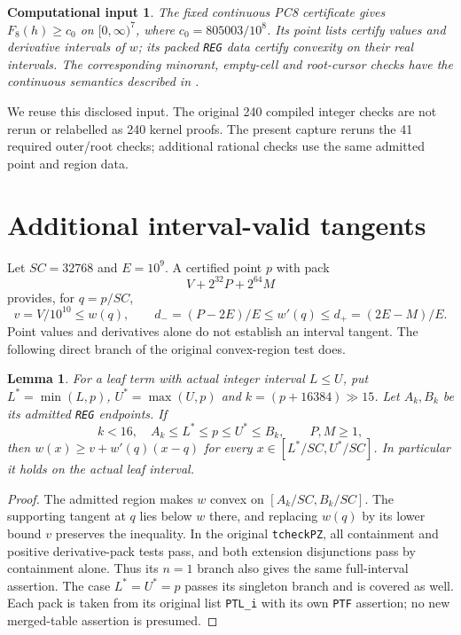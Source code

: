 \documentclass[11pt,a4paper]{article}
\newtheorem{lemma}[theorem]{Lemma}
\newtheorem{inputclaim}[theorem]{Computational input}
\begin{document}
\begin{inputclaim}\label{in:old}
The fixed continuous PC8 certificate gives $F_8(h)\ge c_0$
on $[0,\infty)^7$, where $c_0=805003/10^8$.
Its point lists certify values and derivative intervals of $w$;
its packed \texttt{REG} data certify convexity on their real intervals.
The corresponding minorant, empty-cell and root-cursor checks have
the continuous semantics described in \cite{Joint,Repo}.
\end{inputclaim}

We reuse this disclosed input. The original 240 compiled integer checks
are not rerun or relabelled as 240 kernel proofs. The present capture
reruns the 41 required outer/root checks; additional rational checks
use the same admitted point and region data.

\section{Additional interval-valid tangents}\label{sec:cuts}

Let $SC=32768$ and $E=10^9$. A certified point $p$ with pack
\[
 V+2^{32}P+2^{64}M
\]
provides, for $q=p/SC$,
\[
 v=V/10^{10}\le w(q),\qquad
 d_-=(P-2E)/E\le w'(q)\le d_+=(2E-M)/E.
\]
Point values and derivatives alone do not establish an interval tangent.
The following direct branch of the original convex-region test does.

\begin{lemma}\label{lem:extra}
For a leaf term with actual integer interval $L\le U$, put
$L^*=\min(L,p)$, $U^*=\max(U,p)$ and $k=(p+16384)\mathbin{\gg}15$.
Let $A_k,B_k$ be its admitted \texttt{REG} endpoints. If
\[
 k<16,\quad A_k\le L^*\le p\le U^*\le B_k,\qquad P,M\ge1,
\]
then $w(x)\ge v+w'(q)(x-q)$ for every
$x\in[L^*/SC,U^*/SC]$. In particular it holds on the actual leaf interval.
\end{lemma}
\begin{proof}
The admitted region makes $w$ convex on $[A_k/SC,B_k/SC]$.
The supporting tangent at $q$ lies below $w$ there, and replacing
$w(q)$ by its lower bound $v$ preserves the inequality. In the
original \texttt{tcheckPZ}, all containment and positive derivative-pack
tests pass, and both extension disjunctions pass by containment alone.
Thus its $n=1$ branch also gives the same full-interval assertion.
The case $L^*=U^*=p$ passes its singleton branch and is covered as well.
Each pack is taken from its original list \texttt{PTL\_i} with its own
\texttt{PTF} assertion; no new merged-table assertion is presumed.
\end{proof}
\end{document}
